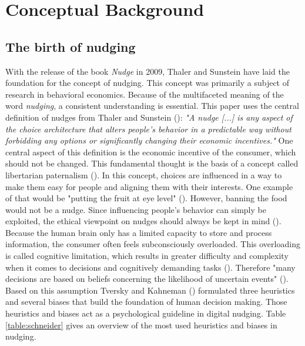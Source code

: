 \section{Conceptual Background}

\subsection{ The birth of nudging}
With the release of the book \textit{Nudge} in 2009, Thaler and Sunstein have laid the foundation for the concept of nudging. This concept was primarily a subject of research in behavioral economics. Because of the multifaceted meaning of the word \textit{nudging}, a consistent understanding is essential. This paper uses the central definition of nudges from Thaler and Sunstein (\citeyear[p.6]{thaler_nudge:_2009}): \textit{"A nudge [...] is any aspect of the choice architecture that alters people's behavior in a predictable way without forbidding any options or significantly changing their economic incentives."}
One central aspect of this definition is the economic incentive of the consumer, which should not be changed. This fundamental thought is the basis of a concept called libertarian paternalism (\cite{thaler_nudge:_2009}). In this concept, choices are influenced in a way to make them easy for people and aligning them with their interests. One example of that would be "putting the fruit at eye level" (\cite[p.6]{thaler_nudge:_2009}). However, banning the food would not be a nudge. Since influencing people's behavior can simply be exploited, the ethical viewpoint on nudges should always be kept in mind (\cite{sunstein_nudging_2015}).
\\

Because the human brain only has a limited capacity to store and process information, the consumer often feels subconsciously overloaded. This overloading is called cognitive limitation, which results in greater difficulty and complexity when it comes to decisions and cognitively demanding tasks (\cite{broniarczyk_decision_2014}). Therefore "many decisions are based on beliefs concerning the likelihood of uncertain events" (\cite[p.1124]{tversky_judgment_1974}). Based on this assumption Tversky and Kahneman (\citeyear{tversky_judgment_1974}) formulated three heuristics and several biases that build the foundation of human decision making. Those heuristics and biases act as a psychological guideline in digital nudging. Table \ref{table:schneider} gives an overview of the most used heuristics and biases in nudging.
\\

